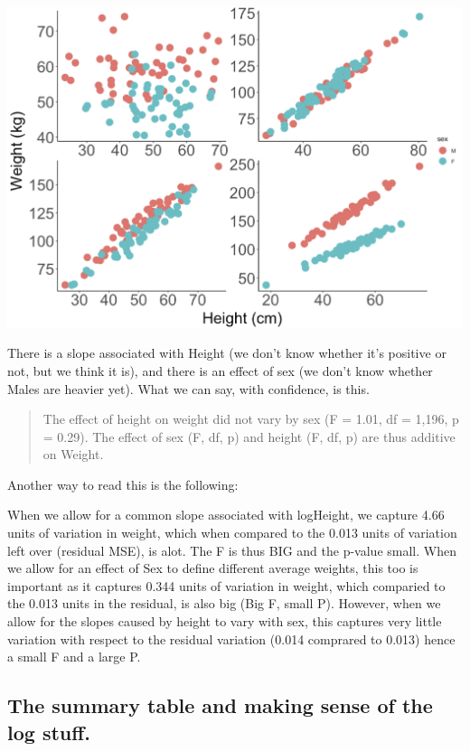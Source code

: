 \documentclass[
]{book}
\begin{document}
\includegraphics[width=17.89in]{images/ANCOVA_1}

There is a slope associated with Height (we don't know whether it's positive or not, but we think it is), and there is an effect of sex (we don't know whether Males are heavier yet). What we can say, with confidence, is this.

\begin{quote}
The effect of height on weight did not vary by sex (F = 1.01, df = 1,196, p = 0.29). The effect of sex (F, df, p) and height (F, df, p) are thus additive on Weight.
\end{quote}

Another way to read this is the following:

When we allow for a common slope associated with logHeight, we capture 4.66 units of variation in weight, which when compared to the 0.013 units of variation left over (residual MSE), is alot. The F is thus BIG and the p-value small. When we allow for an effect of Sex to define different average weights, this too is important as it captures 0.344 units of variation in weight, which comparied to the 0.013 units in the residual, is also big (Big F, small P). However, when we allow for the slopes caused by height to vary with sex, this captures very little variation with respect to the residual variation (0.014 comprared to 0.013) hence a small F and a large P.

\hypertarget{the-summary-table-and-making-sense-of-the-log-stuff.}{%
\subsection{The summary table and making sense of the log stuff.}\label{the-summary-table-and-making-sense-of-the-log-stuff.}}
\end{document}

